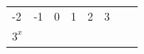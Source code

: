 {\begin{center}
\begin{xtabular*}{\mytablewidth}[t]{|p{10\mystarwidth}|p{10\mystarwidth}|p{10\mystarwidth}|p{10\mystarwidth}|p{10\mystarwidth}|p{10\mystarwidth}|p{10\mystarwidth}|p{10\mystarwidth}|}
        -2 &
    
    
        -1 &
    
    
        0 &
    
    
        1 &
    
    
        2 &
    
    
        3%
     \tabularnewline{}
    
    
        
                \begin{math}{3}^{x}\end{math}
               &
    
    
         &
    
    

\end{xtabular*}
\end{center}}
